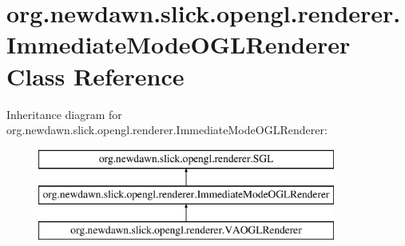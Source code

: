 \hypertarget{classorg_1_1newdawn_1_1slick_1_1opengl_1_1renderer_1_1_immediate_mode_o_g_l_renderer}{}\section{org.\+newdawn.\+slick.\+opengl.\+renderer.\+Immediate\+Mode\+O\+G\+L\+Renderer Class Reference}
\label{classorg_1_1newdawn_1_1slick_1_1opengl_1_1renderer_1_1_immediate_mode_o_g_l_renderer}
Inheritance diagram for org.\+newdawn.\+slick.\+opengl.\+renderer.\+Immediate\+Mode\+O\+G\+L\+Renderer\+:\begin{figure}[H]
\begin{center}
\leavevmode
\includegraphics[height=3.000000cm]{classorg_1_1newdawn_1_1slick_1_1opengl_1_1renderer_1_1_immediate_mode_o_g_l_renderer}
\end{center}
\end{figure}

